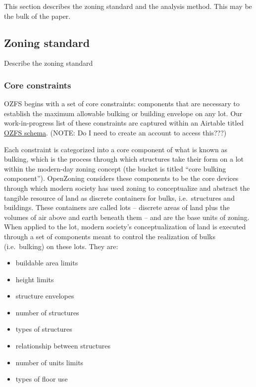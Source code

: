 \documentclass[,]{sagej}
\providecommand{\tightlist}{%
  \setlength{\itemsep}{0pt}\setlength{\parskip}{0pt}}
\begin{document}
This section describes the zoning standard and the analysis method. This may
be the bulk of the paper.

\hypertarget{zoning-standard}{%
\subsection{Zoning standard}\label{zoning-standard}}

Describe the zoning standard

\hypertarget{core-constraints}{%
\subsubsection{Core constraints}\label{core-constraints}}

OZFS begins with a set of core constraints: components that are necessary to
establish the maximum allowable bulking or building envelope on any lot. Our
work-in-progress list of these constraints are captured within an Airtable
titled \href{https://airtable.com/invite/l?inviteId=invIE9Rq8BJxoRZe9\&inviteToken=c24d20d82c00f933e02ca4d7f9b78088b2eaefcef049f3691df85eb48f858fbc\&utm_medium=email\&utm_source=product_team\&utm_content=transactional-alerts}{OZFS schema}. (NOTE: Do I need to create an account to access this???)

Each constraint is categorized into a core component of what is known as bulking, which is the process through which structures take their form on a lot within the modern-day zoning concept (the bucket is titled ``core bulking component''). OpenZoning considers these components to be the core devices through which modern society has used zoning to conceptualize and abstract the tangible resource of land as discrete containers for bulks, i.e.~structures and buildings. These containers are called lots -- discrete areas of land plus the volumes of air above and earth beneath them -- and are the base units of zoning. When applied to the lot, modern society's conceptualization of land is executed through a set of components meant to control the realization of bulks (i.e.~bulking) on these lots. They are:

\begin{itemize}
\tightlist
\item
  buildable area limits
\item
  height limits
\item
  structure envelopes
\item
  number of structures
\item
  types of structures
\item
  relationship between structures
\item
  number of units limits
\item
  types of floor use
\end{itemize}
\end{document}

